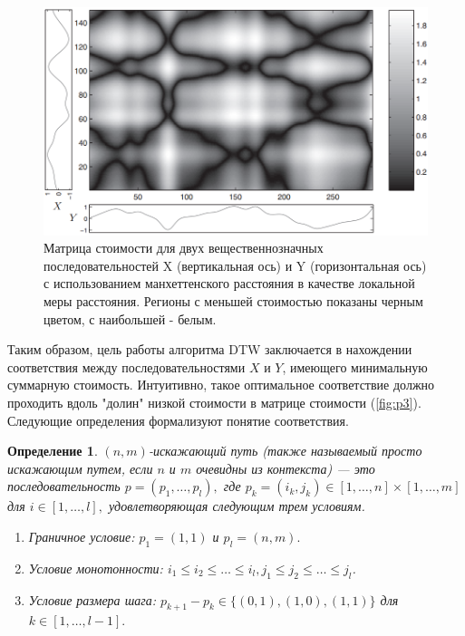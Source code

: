 \documentclass[a4paper, 14pt]{extarticle}
\numberwithin{figure}{subsection}
\let\oldautoref\autoref
\renewcommand{\autoref}[1]{(\oldautoref{#1})}
\numberwithin{equation}{subsection}
\newtheorem{definition}{Определение}[subsection]
\begin{document}
\begin{figure}[h]
\centering
\includegraphics[width=15cm]{p2.png}
\caption{Матрица стоимости для двух вещественнозначных последовательностей X (вертикальная ось) и Y (горизонтальная ось) с использованием манхеттенского расстояния в качестве локальной меры расстояния. Регионы с меньшей стоимостью показаны черным цветом, с наибольшей - белым.}
\label{fig:p2}
\end{figure}
Таким образом, цель работы алгоритма DTW заключается в нахождении соответствия между последовательностями $X$ и $Y$, имеющего минимальную суммарную стоимость. Интуитивно, такое оптимальное соответствие должно проходить вдоль "долин" низкой стоимости в матрице стоимости \autoref{fig:p3}. Следующие определения формализуют понятие соответствия.

\begin{definition} \label{def:1}
	$(n, m)$-искажающий путь (также называемый просто искажающим путем, если $n$ и $m$ очевидны из контекста) --- это последовательность $p=(p_1, \dots, p_l),$ где $p_k = (i_k, j_k) \in [1, \dots, n] \times [1, \dots, m]$ для $i \in [1, \dots, l],$ удовлетворяющая следующим трем условиям.
\begin{enumerate}
\item Граничное условие: $p_1 = (1, 1)$ и $p_l = (n, m).$
\item Условие монотонности: $i_1 \le i_2 \le \dots \le i_l, j_1 \le j_2 \le \dots \le j_l$.
\item Условие размера шага: $p_{k+1}-p_{k} \in \{(0,1),(1,0),(1,1)\}$ для $k \in [1, \dots, l - 1].$
\end{enumerate}
\end{definition}
\end{document}
